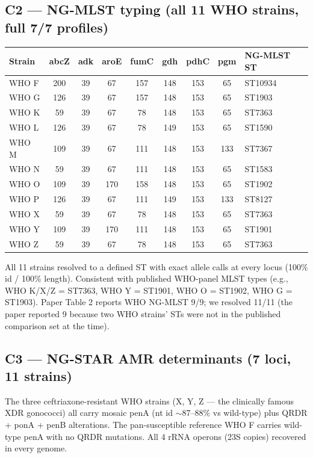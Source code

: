 \documentclass[11pt,letterpaper]{article}
\begin{document}
\subsection{C2 --- NG-MLST typing (all 11 WHO strains, full 7/7 profiles)}

\begin{tabular}{@{}lccccccc l@{}}
\toprule
\textbf{Strain} & \textbf{abcZ} & \textbf{adk} & \textbf{aroE} & \textbf{fumC} & \textbf{gdh} & \textbf{pdhC} & \textbf{pgm} & \textbf{NG-MLST ST} \\
\midrule
WHO F & 200 & 39 & 67 & 157 & 148 & 153 & 65 & ST10934 \\
WHO G & 126 & 39 & 67 & 157 & 148 & 153 & 65 & ST1903 \\
WHO K & 59 & 39 & 67 & 78  & 148 & 153 & 65 & ST7363 \\
WHO L & 126 & 39 & 67 & 78  & 149 & 153 & 65 & ST1590 \\
WHO M & 109 & 39 & 67 & 111 & 148 & 153 & 133 & ST7367 \\
WHO N & 59 & 39 & 67 & 111 & 148 & 153 & 65 & ST1583 \\
WHO O & 109 & 39 & 170 & 158 & 148 & 153 & 65 & ST1902 \\
WHO P & 126 & 39 & 67 & 111 & 149 & 153 & 133 & ST8127 \\
WHO X & 59 & 39 & 67 & 78  & 148 & 153 & 65 & ST7363 \\
WHO Y & 109 & 39 & 170 & 111 & 148 & 153 & 65 & ST1901 \\
WHO Z & 59 & 39 & 67 & 78  & 148 & 153 & 65 & ST7363 \\
\bottomrule
\end{tabular}

All 11 strains resolved to a defined ST with exact allele calls at every locus (100\% id / 100\% length). Consistent with published WHO-panel MLST types (e.g., WHO K/X/Z = ST7363, WHO Y = ST1901, WHO O = ST1902, WHO G = ST1903). Paper Table 2 reports WHO NG-MLST 9/9; we resolved 11/11 (the paper reported 9 because two WHO strains' STs were not in the published comparison set at the time).

\subsection{C3 --- NG-STAR AMR determinants (7 loci, 11 strains)}

The three ceftriaxone-resistant WHO strains (X, Y, Z --- the clinically famous XDR gonococci) all carry mosaic penA (nt id $\sim$87--88\% vs wild-type) plus QRDR + ponA + penB alterations. The pan-susceptible reference WHO F carries wild-type penA with no QRDR mutations. All 4 rRNA operons (23S copies) recovered in every genome.
\end{document}
